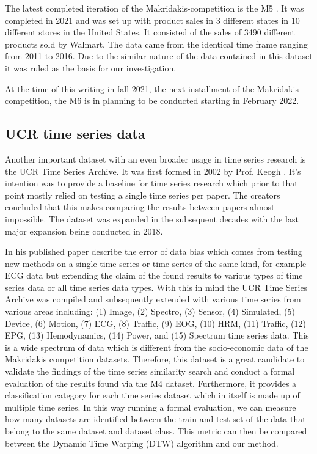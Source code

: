 \documentclass[phd,black, hidelinks]{PrincetonThesis}
\begin{document}
The latest completed  iteration of the Makridakis-competition is the M5 \cite{spiliotis2021}. It was completed in 2021 and was set up with product sales in 3 different states in 10 different stores in the United States. It consisted of the sales of 3490 different products sold by Walmart. The data came from the identical time frame ranging from 2011 to 2016. Due to the similar nature of the data contained in this dataset it was ruled as the basis for our investigation.

At the time of this writing in fall 2021, the next installment of the Makridakis-competition, the M6 is in planning to be conducted starting in February 2022.
\subsection{UCR time series data}
\label{sec:orgab7b219}
\label{orgfc20129}
Another important dataset with an even broader usage in time series research is the UCR Time Series Archive. It was first formed in 2002 by Prof. Keogh \cite{hoang2019}. It's intention was to provide a baseline for time series research which prior to that point mostly relied on testing a single time series per paper. The creators concluded that this makes comparing the results between papers almost impossible. The dataset was expanded in the subsequent decades with the last major expansion being conducted in 2018.

In his \citeyear{keogh2003} published paper \citeauthor{keogh2003} describe the error of data bias which comes from testing new methods on a single time series or time series of the same kind, for example ECG data but extending the claim of the found results to various types of time series data or all time series data types. With this in mind the UCR Time Series Archive was compiled and subsequently extended with various time series from various areas including: (1) Image, (2) Spectro, (3) Sensor, (4) Simulated, (5) Device, (6) Motion, (7) ECG, (8) Traffic, (9) EOG, (10) HRM, (11) Traffic, (12) EPG, (13) Hemodynamics, (14) Power, and (15) Spectrum time series data. This is a wide spectrum of data which is different from the socio-economic data of the Makridakis competition datasets. Therefore, this dataset is a great candidate to validate the findings of the time series similarity search and conduct a formal evaluation of the results found via the M4 dataset. Furthermore, it provides a classification category for each time series dataset which in itself is made up of multiple time series. In this way running a formal evaluation, we can measure how many datasets are identified between the train and test set of the data that belong to the same dataset and dataset class. This metric can then be compared between the Dynamic Time Warping (DTW) algorithm and our method.
\end{document}
